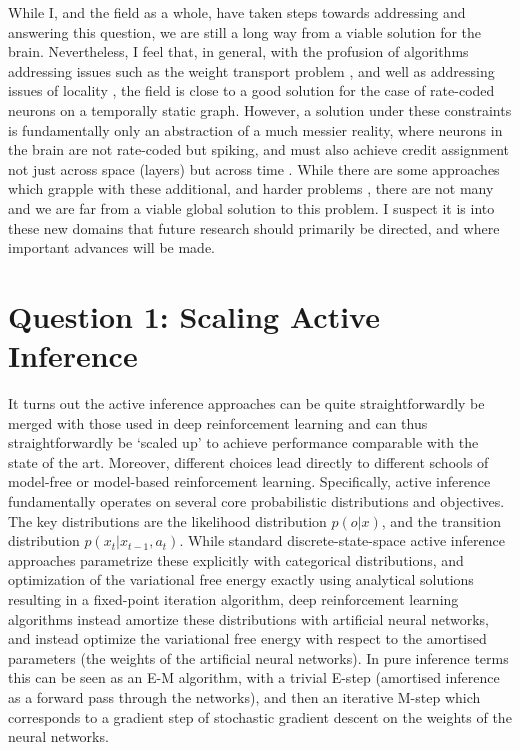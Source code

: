 While I, and the field as a whole, have taken steps towards addressing and answering this question, we are still a long way from a viable solution for the brain. Nevertheless, I feel that, in general, with the profusion of algorithms addressing issues such as the weight transport problem \citep{lillicrap2016random,akrout2019deep,nokland2016direct}, and well as addressing issues of locality \citep{ororbia2019biologically,whittington2017approximation,scellier2016towards}, the field is close to a good solution for the case of rate-coded neurons on a temporally static graph. However, a solution under these constraints is fundamentally only an abstraction of a much messier reality, where neurons in the brain are not rate-coded but spiking, and must also achieve credit assignment not just across space (layers) but across time \citep{lillicrap2020backpropagation}. While there are some approaches which grapple with these additional, and harder problems \citep{zenke2018superspike,bellec2020solution}, there are not many and we are far from a viable global solution to this problem. I suspect it is into these new domains that future research should primarily be directed, and where important advances will be made. 

\section{Question 1: Scaling Active Inference}

It turns out the active inference approaches can be quite straightforwardly be merged with those used in deep reinforcement learning and can thus straightforwardly be `scaled up' to achieve performance comparable with the state of the art. Moreover, different choices lead directly to different schools of model-free or model-based reinforcement learning. Specifically, active inference fundamentally operates on several core probabilistic distributions and objectives. The key distributions are the likelihood distribution $p(o | x)$, and the transition distribution $p(x_t | x_{t-1},a_t)$. While standard discrete-state-space active inference approaches parametrize these explicitly with categorical distributions, and optimization of the variational free energy exactly using analytical solutions resulting in a fixed-point iteration algorithm, deep reinforcement learning algorithms instead amortize these distributions with artificial neural networks, and instead optimize the variational free energy with respect to the amortised parameters (the weights of the artificial neural networks). In pure inference terms this can be seen as an E-M algorithm, with a trivial E-step (amortised inference as a forward pass through the networks), and then an iterative M-step which corresponds to a gradient step of stochastic gradient descent on the weights of the neural networks. 

